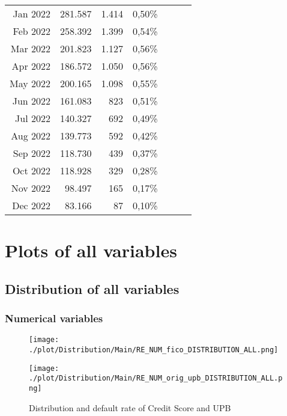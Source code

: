 \begin{longtable}{r|rrr|rrr}
Jan 2022 & 281.587 & 1.414 & 0,50\% &         &       &        \\
Feb 2022 & 258.392 & 1.399 & 0,54\% &         &       &        \\
Mar 2022 & 201.823 & 1.127 & 0,56\% &         &       &        \\
Apr 2022 & 186.572 & 1.050 & 0,56\% &         &       &        \\
May 2022 & 200.165 & 1.098 & 0,55\% &         &       &        \\
Jun 2022 & 161.083 & 823   & 0,51\% &         &       &        \\
Jul 2022 & 140.327 & 692   & 0,49\% &         &       &        \\
Aug 2022 & 139.773 & 592   & 0,42\% &         &       &        \\
Sep 2022 & 118.730 & 439   & 0,37\% &         &       &        \\
Oct 2022 & 118.928 & 329   & 0,28\% &         &       &        \\
Nov 2022 & 98.497  & 165   & 0,17\% &         &       &        \\
Dec 2022 & 83.166  & 87    & 0,10\% &         &       &        \\\bottomrule

\end{longtable}

\chapter{Plots of all variables}

\section{Distribution of all variables}
\label{sec:distr_all}

\subsection{Numerical variables}

\begin{figure}[H]
\begin{minipage}{.5\textwidth}
	\centering
	\texttt{[image: ./plot/Distribution/Main/RE\_NUM\_fico\_DISTRIBUTION\_ALL.png]}
\end{minipage}%
\begin{minipage}{.5\textwidth}
	\centering
	\texttt{[image: ./plot/Distribution/Main/RE\_NUM\_orig\_upb\_DISTRIBUTION\_ALL.png]}
\end{minipage}
    \caption{Distribution and default rate of Credit Score and UPB}
\end{figure}


